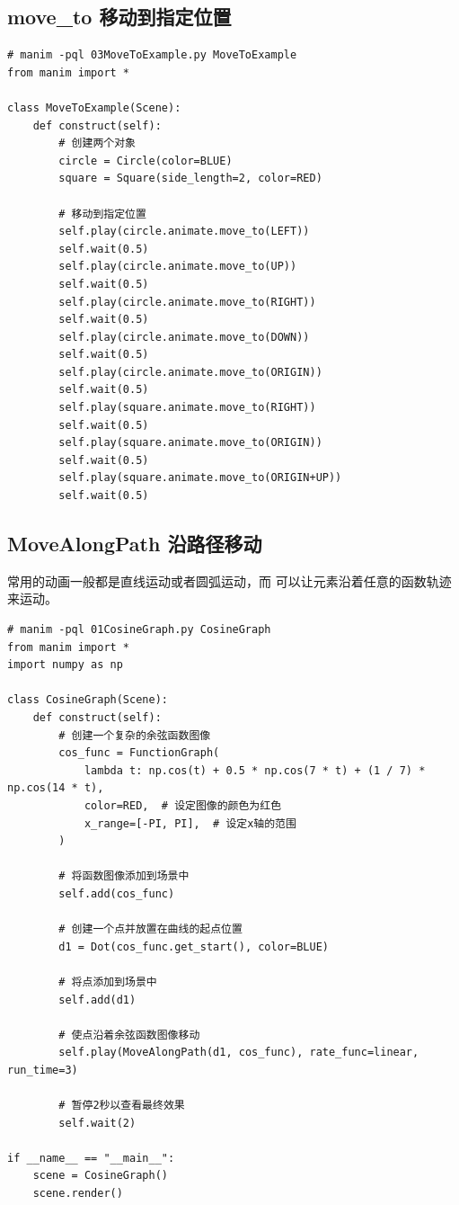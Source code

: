 \subsection{move\_to 移动到指定位置}
\label{subsubsec:manim_animation_move_moveto}
\begin{lstlisting}[style=pythonstyle]
# manim -pql 03MoveToExample.py MoveToExample
from manim import *

class MoveToExample(Scene):
    def construct(self):
        # 创建两个对象
        circle = Circle(color=BLUE)
        square = Square(side_length=2, color=RED)

        # 移动到指定位置
        self.play(circle.animate.move_to(LEFT))
        self.wait(0.5)
        self.play(circle.animate.move_to(UP))
        self.wait(0.5)
        self.play(circle.animate.move_to(RIGHT))
        self.wait(0.5)
        self.play(circle.animate.move_to(DOWN))
        self.wait(0.5)
        self.play(circle.animate.move_to(ORIGIN))
        self.wait(0.5)
        self.play(square.animate.move_to(RIGHT))
        self.wait(0.5)
        self.play(square.animate.move_to(ORIGIN))
        self.wait(0.5)
        self.play(square.animate.move_to(ORIGIN+UP))
        self.wait(0.5)

\end{lstlisting}

\subsection{MoveAlongPath 沿路径移动}
\label{subsubsec:manim_animation_move_movealongpath}
常用的动画一般都是直线运动或者圆弧运动，而  可以让元素沿着任意的函数轨迹来运动。

\begin{lstlisting}[style=pythonstyle]
# manim -pql 01CosineGraph.py CosineGraph
from manim import *
import numpy as np

class CosineGraph(Scene):
    def construct(self):
        # 创建一个复杂的余弦函数图像
        cos_func = FunctionGraph(
            lambda t: np.cos(t) + 0.5 * np.cos(7 * t) + (1 / 7) * np.cos(14 * t),
            color=RED,  # 设定图像的颜色为红色
            x_range=[-PI, PI],  # 设定x轴的范围
        )
        
        # 将函数图像添加到场景中
        self.add(cos_func)
        
        # 创建一个点并放置在曲线的起点位置
        d1 = Dot(cos_func.get_start(), color=BLUE)
        
        # 将点添加到场景中
        self.add(d1)
        
        # 使点沿着余弦函数图像移动
        self.play(MoveAlongPath(d1, cos_func), rate_func=linear, run_time=3)
        
        # 暂停2秒以查看最终效果
        self.wait(2)

if __name__ == "__main__":
    scene = CosineGraph()
    scene.render()
\end{lstlisting}

